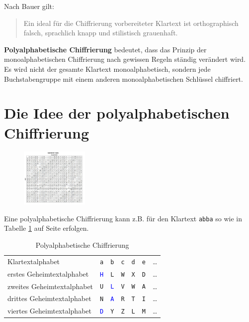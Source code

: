 \documentclass[%
11pt,%
twoside,%
titlepage,%
german,%
headsepline%
]{scrartcl}
\newcommand{\spaltenheight}{\rule{0mm}{3ex}}
\newcommand{\spaltensep}{\\[1ex]}
\begin{document}
\begin{bem}
Nach Bauer gilt:
\begin{quote}
Ein ideal für die Chiffrierung vorbereiteter Klartext ist orthographisch falsch, sprachlich knapp und stilistisch grauenhaft.
\end{quote}
\end{bem}

\textbf{Polyalphabetische Chiffrierung} bedeutet, dass das Prinzip der monoalphabetischen Chiffrierung nach gewissen Regeln ständig verändert wird. Es wird nicht der gesamte Klartext monoalphabetisch, sondern jede Buchstabengruppe mit einem anderen monoalphabetischen Schlüssel chiffriert.

\clearpage

\section{Die Idee der polyalphabetischen Chiffrierung}
\begin{figure}
\vspace{-22pt}
  \begin{center}
    \includegraphics[width=0.29\textwidth]{pictures/vigeneretable}
  \end{center}
\vspace{-22pt}
\end{figure}
Eine polyalphabetische Chiffrierung kann z.B. für den Klartext \texttt{abba} so wie in Tabelle \ref{polyalph} auf Seite \pageref{polyalph} erfolgen.
\begin{table}
\begin{tabular}{lcccccl}
\spaltenheight Klartextalphabet & \texttt{a}& \texttt{b}& \texttt{c}& \texttt{d}& \texttt{e}& \dots\spaltensep
\spaltenheight erstes Geheimtextalphabet & \textcolor{blue}{\texttt{H}}& \texttt{L}& \texttt{W}& \texttt{X}& \texttt{D}& \dots\spaltensep
\spaltenheight zweites Geheimtextalphabet & \texttt{U}& \textcolor{blue}{\texttt{L}}& \texttt{V}& \texttt{W}& \texttt{A}& \dots\spaltensep
\spaltenheight drittes Geheimtextalphabet & \texttt{N}& \textcolor{blue}{\texttt{A}}& \texttt{R}& \texttt{T}& \texttt{I}& \dots\spaltensep
\spaltenheight viertes Geheimtextalphabet & \textcolor{blue}{\texttt{D}}& \texttt{Y}& \texttt{Z}& \texttt{L}& \texttt{M}& \dots\spaltensep
\end{tabular}
\caption{Polyalphabetische Chiffrierung}\label{polyalph}
\end{table}
\end{document}
